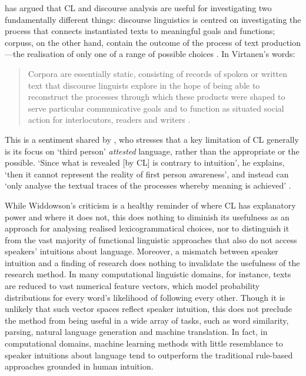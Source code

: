 \textcite{virtanen_discourse_2009} has argued that \gls{CL} and discourse analysis are useful for investigating two fundamentally different things: discourse linguistics is centred on investigating the process that connects instantiated texts to meaningful goals and functions; \glspl{corpus}, on the other hand, contain the outcome of the process of text production---the realisation of only one of a range of possible choices \cite{martin_english_1992}. In Virtanen's words:

\begin{quote}\singlespacing\small
Corpora are essentially static, consisting of records of spoken or written text that discourse linguists explore in the hope of being able to reconstruct the processes through which these products were shaped to serve particular communicative goals and to function as situated social action for interlocutors, readers and writers \parencite*[p.~50]{virtanen_discourse_2009}.
\end{quote}
%
This is a sentiment shared by \textcite{widdowson_limitations_2000}, who stresses that a key limitation of \gls{CL} generally is its focus on `third person' \emph{attested} language, rather than the appropriate or the possible. `Since what is revealed [by \gls{CL}] is contrary to intuition', he explains, `then it cannot represent the reality of first person awareness', and instead can `only analyse the textual traces of the processes whereby meaning is achieved' \parencite*[p.~6]{widdowson_limitations_2000}.

While Widdowson's criticism is a healthy reminder of where \gls{CL} has explanatory power and where it does not, this does nothing to diminish its usefulness as an approach for analysing realised lexicogrammatical choices, nor to distinguish it from the vast majority of functional linguistic approaches that also do not access speakers' intuitions about language. Moreover, a mismatch between speaker intuition and a finding of research does nothing to invalidate the usefulness of the research method. In many computational linguistic domains, for instance, texts are reduced to vast numerical feature vectors, which model probability distributions for every word's likelihood of following every other. Though it is unlikely that such vector spaces reflect speaker intuition, this does not preclude the method from being useful in a wide array of tasks, such as word similarity, parsing, natural language generation and machine translation. In fact, in computational domains, machine learning methods with little resemblance to speaker intuitions about language tend to outperform the traditional rule-based approaches grounded in human intuition.

